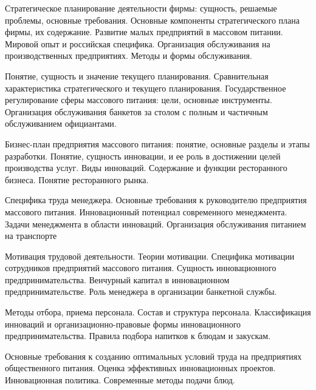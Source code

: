\documentclass[
	11pt,
	a4paper,
	]
	{article}
\begin{document}
\bigskip

\noindent{} 
	{
		Стратегическое планирование деятельности фирмы: сущность, решаемые проблемы, основные требования. Основные компоненты стратегического плана фирмы, их содержание.
	}{
		Развитие малых предприятий в массовом питании. Мировой опыт и российская специфика.
	}{
		Организация обслуживания на производственных предприятиях. Методы и формы обслуживания.
	}

\bigskip

\noindent{} 
	{
		Понятие, сущность и значение текущего планирования. Сравнительная характеристика стратегического и текущего планирования.
	}{
		Государственное регулирование сферы массового питания: цели, основные инструменты.
	}{
		Организация обслуживания банкетов за столом с полным и частичным обслуживанием официантами.
	}

\bigskip

\noindent{} 
	{
		Бизнес-план предприятия массового питания: понятие, основные разделы и этапы разработки.
	}{
		Понятие, сущность инновации, и ее роль в достижении целей производства услуг. Виды инноваций.
	}{
		Содержание и функции ресторанного бизнеса. Понятие ресторанного рынка.
	}

\bigskip

\noindent{} 
	{
		Специфика труда менеджера. Основные требования к руководителю предприятия массового питания.
	}{
		Инновационный потенциал современного менеджмента. Задачи менеджмента в области инноваций.
	}{
		Организация обслуживания питанием на транспорте
	}

\bigskip

\noindent{} 
	{
		Мотивация трудовой деятельности. Теории мотивации. Специфика мотивации сотрудников предприятий массового питания.
	}{
		Сущность инновационного предпринимательства. Венчурный капитал в инновационном предпринимательстве.
	}{
		Роль менеджера в организации банкетной службы.
	}

\bigskip

\noindent{} 
	{
		Методы отбора, приема персонала. Состав и структура персонала.
	}{
		Классификация инноваций и организационно-правовые формы инновационного предпринимательства.
	}{
		Правила подбора напитков к блюдам и закускам.
	}

\bigskip

\noindent{} 
	{
		Основные требования к созданию оптимальных условий труда на предприятиях общественного питания.
	}{
		Оценка эффективных инновационных проектов. Инновационная политика.
	}{
		Современные методы подачи блюд.
	}
\end{document}
